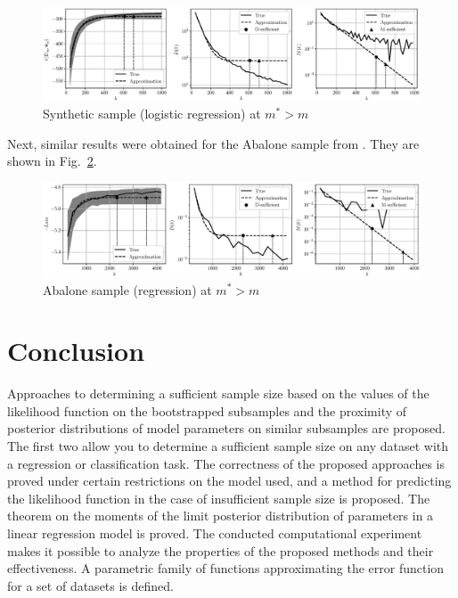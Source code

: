 \documentclass[
11pt,%
tightenlines,%
twoside,%
onecolumn,%
nofloats,%
nobibnotes,%
nofootinbib,%
superscriptaddress,%
noshowpacs,%
centertags]%
{revtex4-2}
\begin{document}
\begin{figure}[h!]
    \centering
    \includegraphics[width=\textwidth]{../paper/figures/gray/eps/synthetic-classification-approximation}
    \caption{Synthetic sample (logistic regression) at $m^*> m$}
    \label{synthetic-classification-approximation}
\end{figure}

Next, similar results were obtained for the Abalone sample from \citep{UCI}. They are shown in Fig.~\ref{abalone-approximation}.

\begin{figure}[h!]
    \centering
    \includegraphics[width=\textwidth]{../paper/figures/gray/eps/abalone-approximation}
    \caption{Abalone sample (regression) at $m^* > m$}
    \label{abalone-approximation}
\end{figure}

\section{Conclusion}

Approaches to determining a sufficient sample size based on the values of the likelihood function on the bootstrapped subsamples and the proximity of posterior distributions of model parameters on similar subsamples are proposed. The first two allow you to determine a sufficient sample size on any dataset with a regression or classification task. The correctness of the proposed approaches is proved under certain restrictions on the model used, and a method for predicting the likelihood function in the case of insufficient sample size is proposed. The theorem on the moments of the limit posterior distribution of parameters in a linear regression model is proved. The conducted computational experiment makes it possible to analyze the properties of the proposed methods and their effectiveness. A parametric family of functions approximating the error function for a set of datasets is defined.
\end{document}
